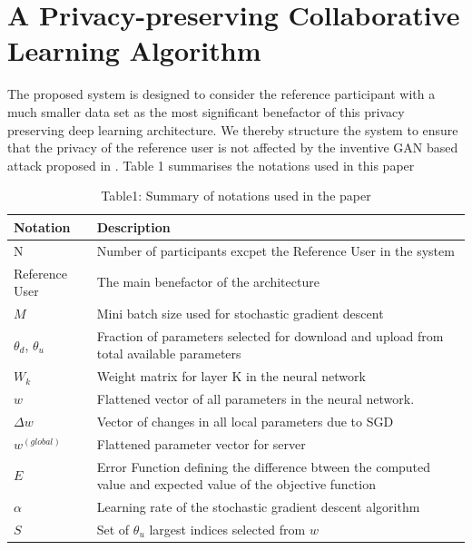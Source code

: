 \documentclass[conference]{IEEEtran}
\begin{document}
\section{A Privacy-preserving Collaborative Learning Algorithm}

The proposed system is designed to consider the reference participant with a much smaller data set as the most significant benefactor
of this privacy preserving deep learning architecture. We thereby structure the system to ensure that the privacy of the reference user
is not affected by the inventive GAN based attack proposed in \cite{hitaj2017deep}. Table 1 summarises the notations used in this paper


\begin{table}[!h]
\centering
\caption{Table1: Summary of notations used in the paper}
\label{table:1}
\begin{tabular}{ | m{} | m{}| } 
\hline
\textbf{Notation} & \textbf{Description} \\
 \hline\hline

N & Number of participants excpet the Reference User in the system\\
\hline
Reference User & The  main benefactor of the architecture \\
\hline
$M$ & Mini batch size used for stochastic gradient descent\\
\hline
$\theta_d$, $\theta_u$ & Fraction of parameters selected for download and upload from total available parameters \\
\hline
$W_k$ & Weight matrix for layer K in the neural network\\
\hline
$w$ & Flattened vector of all parameters in the neural network. \\
\hline
$\Delta w$ & Vector of changes in all local parameters due to SGD\\
\hline
$w^{(global)}$ & Flattened parameter vector for server\\
\hline
$E$ & Error Function defining the difference btween the computed value and expected value of the objective function \\
\hline
$\alpha$ & Learning rate of the stochastic gradient descent algorithm\\
\hline
$S$ & Set of $\theta_u$ largest indices selected from $w$ \\
\hline
\end{tabular}
\end{table}

\end{document}
